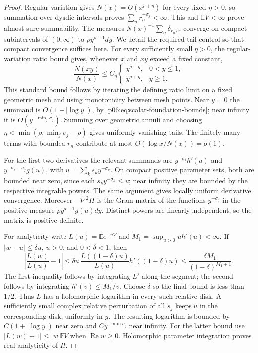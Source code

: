 \documentclass[11pt,letterpaper]{article}
\theoremstyle{definition}
\theoremstyle{remark}
\renewcommand{\Re}{\operatorname{Re}}
\newcommand{\1}{\mathbf 1}
\begin{document}
\begin{proof}
Regular variation gives $N(x)=O(x^{\rho+\eta})$ for every fixed
$\eta>0$, so summation over dyadic intervals proves
$\sum_nr_n^{-\sigma_j}<\infty$.  This and $\mathbb EV<\infty$
prove almost-sure summability.  The measures
$N(x)^{-1}\sum_n\delta_{r_n/x}$ converge on compact subintervals of
$(0,\infty)$ to $\rho y^{\rho-1}dy$.  We detail the required tail
control so that compact convergence suffices here.
For every sufficiently small $\eta>0$, the regular-variation ratio
bound gives, whenever $x$ and $xy$ exceed a fixed constant,
\[
 \frac{N(xy)}{N(x)}\le C_\eta
 \begin{cases}y^{\rho-\eta},&0<y\le1,\\
 y^{\rho+\eta},&y\ge1.
 \end{cases}
\]
This standard bound follows by iterating the defining ratio limit
on a fixed geometric mesh and using monotonicity between mesh points.
Near $y=0$ the summand is $O(1+|\log y|)$, by
\eqref{p06:eq:scalar-foundation-bounds}; near infinity it is
$O(y^{-\min_j\sigma_j})$.  Summing over geometric annuli and choosing
$\eta<\min(\rho,\min_j\sigma_j-\rho)$ gives uniformly vanishing
tails.  The finitely many terms with bounded $r_n$ contribute at most
$O(\log x/N(x))=o(1)$.

For the first two derivatives the relevant summands are
$y^{-\sigma_i}h'(u)$ and
$y^{-\sigma_i-\sigma_j}g(u)$, with
$u=\sum_ks_ky^{-\sigma_k}$.  On compact positive parameter sets,
both are bounded near zero, since each $s_ky^{-\sigma_k}\le u$;
near infinity they are bounded by the respective integrable powers.
The same argument gives locally uniform derivative convergence.
Moreover $-\nabla^2H$ is the Gram matrix of the functions
$y^{-\sigma_j}$ in the positive measure
$\rho y^{\rho-1}g(u)dy$.  Distinct powers are linearly independent,
so the matrix is positive definite.

For analyticity write $L(u)=\mathbb E e^{-uV}$ and
$M_1=\sup_{u>0}u h'(u)<\infty$.
If $|w-u|\le\delta u$, $u>0$, and $0<\delta<1$, then
\[
 \left|\frac{L(w)}{L(u)}-1\right|
 \le\delta u\,\frac{L((1-\delta)u)}{L(u)}h'((1-\delta)u)
 \le\frac{\delta M_1}{(1-\delta)^{M_1+1}}.
\]
The first inequality follows by integrating $L'$ along the segment;
the second follows by integrating $h'(v)\le M_1/v$.
Choose $\delta$ so the final bound is less than $1/2$.
Thus $L$ has a holomorphic logarithm in every such relative disk.
A sufficiently small complex relative perturbation of all $s_j$
keeps $u$ in the corresponding disk, uniformly in $y$.
The resulting logarithm is bounded by $C(1+|\log y|)$ near zero
and $Cy^{-\min\sigma_j}$ near infinity.  For the latter bound use
$|L(w)-1|\le |w|\mathbb EV$ when $\Re w\ge0$.
Holomorphic parameter integration proves real analyticity of $H$.


\end{proof}
\end{document}
